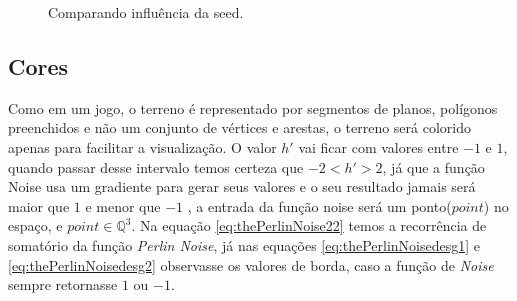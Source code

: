 \begin{figure}[H]
     \centering
     \hspace{0.1cm}
     \hspace{0.1cm}
     \caption{Comparando influência da seed.}
     \label{fig:parametrosSeed}
\end{figure}


\subsection{Cores}
Como em um jogo, o terreno é representado por segmentos de planos, polígonos preenchidos e não um conjunto
de vértices e arestas, o terreno será colorido apenas para facilitar a
visualização. O valor $h'$ vai ficar com valores entre $-1$ e $1$, 
quando passar desse intervalo temos certeza que $-2 < h' > 2$, já que a função Noise 
usa um gradiente para gerar seus valores e o seu resultado jamais será maior que $1$
e menor que $-1$ \cite{perlin1985image}, a entrada da função noise será um ponto($point$) no espaço, e $point \in \mathbb{Q}^{3}$.
Na equação \ref{eq:thePerlinNoise22} temos a recorrência de somatório da função
\textit{Perlin Noise}, já nas equações \ref{eq:thePerlinNoisedesg1} e \ref{eq:thePerlinNoisedesg2}
observasse os valores de borda, caso a função de \textit{Noise} sempre retornasse $1$ ou $-1$.


